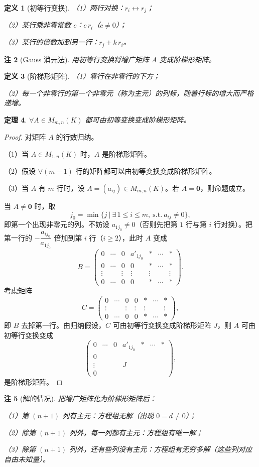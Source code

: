 \documentclass[UTF8,11pt]{ctexart}
\theoremstyle{cnthm}
\newtheorem{thm}{定理}[section]
\newtheorem{defn}[thm]{定义}
\newtheorem{rem}[thm]{注}
\begin{document}
\begin{defn}[初等行变换]
（1）两行对换：$r_i\leftrightarrow r_j$；

（2）某行乘非零常数 $c$：$c\,r_i$（$c\neq0$）；

（3）某行的倍数加到另一行：$r_j+k\,r_i$。
\end{defn}

\begin{rem}[Gauss 消元法]
用初等行变换将增广矩阵 $\bar{A}$ 变成阶梯形矩阵。
\end{rem}

\begin{defn}[阶梯形矩阵]
（1）零行在非零行的下方；

（2）每一个非零行的第一个非零元（称为主元）的列标，随着行标的增大而严格递增。
\end{defn}

\begin{thm}
$\forall A\in M_{m,n}(K)$ 都可由初等变换变成阶梯形矩阵。
\end{thm}

\begin{proof}
对矩阵 $A$ 的行数归纳。

（1）当 $A\in M_{1,n}(K)$ 时，$A$ 是阶梯形矩阵。

（2）假设 $\forall(m-1)$ 行的矩阵都可以由初等变换变成阶梯形矩阵。

（3）当 $A$ 有 $m$ 行时，设 $A=(a_{ij})\in M_{m,n}(K)$。若 $A=\mathbf{0}$，则命题成立。

当 $A\neq\mathbf{0}$ 时，取
\[
j_0=\min\bigl\{j\ \big|\ \exists\,1\leq i\leq m,\ \text{s.t.}\ a_{ij}\neq0\bigr\},
\]
即第一个出现非零元的列。不妨设 $a_{1j_0}\neq0$（否则先把第 $1$ 行与第 $i$ 行对换）。把第一行的 $-\dfrac{a_{ij_0}}{a_{1j_0}}$ 倍加到第 $i$ 行（$i\geq2$），此时 $A$ 变成
\[
B=
\begin{pmatrix}
0 & \cdots & 0 & a'_{1j_0} & \ast & \cdots & \ast\\
0 & \cdots & 0 & 0 & \ast & \cdots & \ast\\
\vdots & & \vdots & \vdots & \vdots & & \vdots\\
0 & \cdots & 0 & 0 & \ast & \cdots & \ast
\end{pmatrix}.
\]
考虑矩阵
\[
C=
\begin{pmatrix}
0 & \cdots & 0 & 0 & \ast & \cdots & \ast\\
\vdots & & \vdots & \vdots & \vdots & & \vdots\\
0 & \cdots & 0 & 0 & \ast & \cdots & \ast
\end{pmatrix},
\]
即 $B$ 去掉第一行。由归纳假设，$C$ 可由初等行变换变成阶梯形矩阵 $J$，则 $A$ 可由初等行变换变成
\[
\begin{pmatrix}
0 & \cdots & 0 & a'_{1j_0} & \ast & \cdots & \ast\\[2pt]
0 & & & & & & \\
\vdots & & & J & & & \\
0 & & & & & &
\end{pmatrix},
\]
是阶梯形矩阵。
\end{proof}

\begin{rem}[解的情况]
把增广矩阵化为阶梯形矩阵后：

（1）第 $(n+1)$ 列有主元：方程组无解（出现 $0=d\neq0$）；

（2）除第 $(n+1)$ 列外，每一列都有主元：方程组有唯一解；

（3）除第 $(n+1)$ 列外，还有些列没有主元：方程组有无穷多解（这些列对应自由未知量）。
\end{rem}
\end{document}
